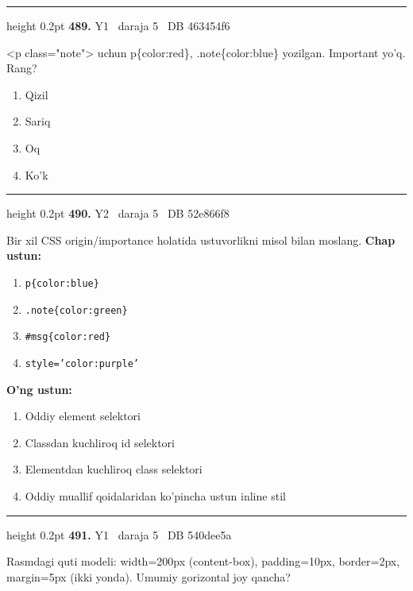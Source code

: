 \documentclass[10pt,a4paper,oneside]{article}
\begin{document}
\vspace{2mm}\hrule height 0.2pt \vspace{4mm}
\hypertarget{q489}{\textbf{\color{ink}489.}}  {\color{muted}\scriptsize Y1 \textbullet\ daraja 5 \textbullet\ DB 463454f6}
\par
\textless{}p class="note"\textgreater{} uchun p\{color:red\}, .note\{color:blue\} yozilgan. Important yo'q. Rang?
\begin{enumerate}[label=\Alph*),leftmargin=9mm]
\item Qizil
\item Sariq
\item Oq
\item Ko'k
\end{enumerate}
\vspace{2mm}\hrule height 0.2pt \vspace{4mm}
\hypertarget{q490}{\textbf{\color{ink}490.}}  {\color{muted}\scriptsize Y2 \textbullet\ daraja 5 \textbullet\ DB 52e866f8}
\par
Bir xil CSS origin/importance holatida ustuvorlikni misol bilan moslang.
\textbf{\footnotesize Chap ustun:}
\begin{enumerate}[label=\arabic*),leftmargin=9mm]
\item \texttt{p\{color:blue\}}
\item \texttt{.note\{color:green\}}
\item \texttt{\#msg\{color:red\}}
\item \texttt{style='color:purple'}
\end{enumerate}
\textbf{\footnotesize O'ng ustun:}
\begin{enumerate}[label=\Alph*),leftmargin=9mm]
\item Oddiy element selektori
\item Classdan kuchliroq id selektori
\item Elementdan kuchliroq class selektori
\item Oddiy muallif qoidalaridan ko'pincha ustun inline stil
\end{enumerate}
\vspace{2mm}\hrule height 0.2pt \vspace{4mm}
\hypertarget{q491}{\textbf{\color{ink}491.}}  {\color{muted}\scriptsize Y1 \textbullet\ daraja 5 \textbullet\ DB 540dee5a}
\par
Rasmdagi quti modeli: width=200px (content-box), padding=10px, border=2px, margin=5px (ikki yonda). Umumiy gorizontal joy qancha?
\end{document}
